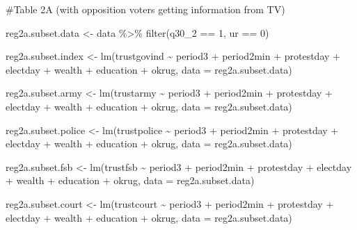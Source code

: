 \documentclass[
  letterpaper,
  DIV=11,
  numbers=noendperiod]{scrartcl}
\newenvironment{Shaded}{\begin{snugshade}}{\end{snugshade}}
\newcommand{\AttributeTok}[1]{\textcolor[rgb]{0.40,0.45,0.13}{#1}}
\newcommand{\CommentTok}[1]{\textcolor[rgb]{0.37,0.37,0.37}{#1}}
\newcommand{\DecValTok}[1]{\textcolor[rgb]{0.68,0.00,0.00}{#1}}
\newcommand{\FunctionTok}[1]{\textcolor[rgb]{0.28,0.35,0.67}{#1}}
\newcommand{\NormalTok}[1]{\textcolor[rgb]{0.00,0.23,0.31}{#1}}
\newcommand{\OtherTok}[1]{\textcolor[rgb]{0.00,0.23,0.31}{#1}}
\newcommand{\SpecialCharTok}[1]{\textcolor[rgb]{0.37,0.37,0.37}{#1}}
\begin{document}
\begin{Shaded}
\begin{Highlighting}[]
\CommentTok{\#Table 2A (with opposition voters getting information from TV)}

\NormalTok{reg2a.subset.data }\OtherTok{\textless{}{-}}\NormalTok{ data }\SpecialCharTok{\%\textgreater{}\%} 
  \FunctionTok{filter}\NormalTok{(q30\_2 }\SpecialCharTok{==} \DecValTok{1}\NormalTok{, ur }\SpecialCharTok{==} \DecValTok{0}\NormalTok{)}

\NormalTok{reg2a.subset.index }\OtherTok{\textless{}{-}} \FunctionTok{lm}\NormalTok{(trustgovind }\SpecialCharTok{\textasciitilde{}}\NormalTok{ period3 }\SpecialCharTok{+}\NormalTok{ period2min }\SpecialCharTok{+}\NormalTok{ protestday }\SpecialCharTok{+}\NormalTok{ electday }\SpecialCharTok{+}
\NormalTok{    wealth }\SpecialCharTok{+}\NormalTok{ education }\SpecialCharTok{+}\NormalTok{ okrug, }\AttributeTok{data =}\NormalTok{ reg2a.subset.data)}

\NormalTok{reg2a.subset.army }\OtherTok{\textless{}{-}} \FunctionTok{lm}\NormalTok{(trustarmy }\SpecialCharTok{\textasciitilde{}}\NormalTok{ period3 }\SpecialCharTok{+}\NormalTok{ period2min }\SpecialCharTok{+}\NormalTok{ protestday }\SpecialCharTok{+}\NormalTok{ electday }\SpecialCharTok{+}
\NormalTok{    wealth }\SpecialCharTok{+}\NormalTok{ education }\SpecialCharTok{+}\NormalTok{ okrug, }\AttributeTok{data =}\NormalTok{ reg2a.subset.data)}

\NormalTok{reg2a.subset.police }\OtherTok{\textless{}{-}} \FunctionTok{lm}\NormalTok{(trustpolice }\SpecialCharTok{\textasciitilde{}}\NormalTok{ period3 }\SpecialCharTok{+}\NormalTok{ period2min }\SpecialCharTok{+}\NormalTok{ protestday }\SpecialCharTok{+}\NormalTok{ electday }\SpecialCharTok{+}
\NormalTok{    wealth }\SpecialCharTok{+}\NormalTok{ education }\SpecialCharTok{+}\NormalTok{ okrug, }\AttributeTok{data =}\NormalTok{ reg2a.subset.data)}

\NormalTok{reg2a.subset.fsb }\OtherTok{\textless{}{-}} \FunctionTok{lm}\NormalTok{(trustfsb }\SpecialCharTok{\textasciitilde{}}\NormalTok{ period3 }\SpecialCharTok{+}\NormalTok{ period2min }\SpecialCharTok{+}\NormalTok{ protestday }\SpecialCharTok{+}\NormalTok{ electday }\SpecialCharTok{+}
\NormalTok{    wealth }\SpecialCharTok{+}\NormalTok{ education }\SpecialCharTok{+}\NormalTok{ okrug, }\AttributeTok{data =}\NormalTok{ reg2a.subset.data)}

\NormalTok{reg2a.subset.court }\OtherTok{\textless{}{-}} \FunctionTok{lm}\NormalTok{(trustcourt }\SpecialCharTok{\textasciitilde{}}\NormalTok{ period3 }\SpecialCharTok{+}\NormalTok{ period2min }\SpecialCharTok{+}\NormalTok{ protestday }\SpecialCharTok{+}\NormalTok{ electday }\SpecialCharTok{+}
\NormalTok{    wealth }\SpecialCharTok{+}\NormalTok{ education }\SpecialCharTok{+}\NormalTok{ okrug, }\AttributeTok{data =}\NormalTok{ reg2a.subset.data)}


\end{Highlighting}
\end{Shaded}
\end{document}

